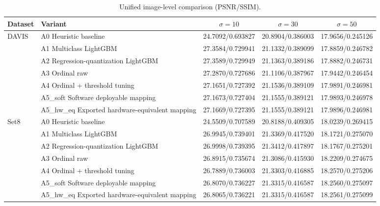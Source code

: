 \begin{table}[t]
\centering
\caption{Unified image-level comparison (PSNR/SSIM).}
\label{tab:unified_image}
\setlength{\tabcolsep}{4pt}
\begin{tabular}{llccc}
\toprule
Dataset & Variant & $\sigma=10$ & $\sigma=30$ & $\sigma=50$ \\
\midrule
\multirow{7}{*}{DAVIS} & A0 Heuristic baseline & 24.7092/0.693827 & 20.8904/0.386003 & 17.9656/0.245126 \\
 & A1 Multiclass LightGBM & 27.3584/0.729941 & 21.1332/0.389099 & 17.8859/0.246782 \\
 & A2 Regression-quantization LightGBM & 27.3589/0.729949 & 21.1363/0.389186 & 17.8882/0.246731 \\
 & A3 Ordinal raw & 27.2870/0.727686 & 21.1106/0.387967 & 17.9442/0.246454 \\
 & A4 Ordinal + threshold tuning & 27.1651/0.727392 & 21.1536/0.389109 & 17.9891/0.246981 \\
 & A5_soft Software deployable mapping & 27.1673/0.727404 & 21.1555/0.389121 & 17.9893/0.246978 \\
 & A5_hw_eq Exported hardware-equivalent mapping & 27.1669/0.727395 & 21.1555/0.389121 & 17.9896/0.246981 \\
\midrule
\multirow{7}{*}{Set8} & A0 Heuristic baseline & 24.5509/0.707589 & 20.8188/0.409305 & 18.0239/0.269415 \\
 & A1 Multiclass LightGBM & 26.9945/0.739401 & 21.3369/0.417520 & 18.1721/0.275070 \\
 & A2 Regression-quantization LightGBM & 26.9998/0.739395 & 21.3412/0.417897 & 18.1767/0.275201 \\
 & A3 Ordinal raw & 26.8915/0.735674 & 21.3086/0.415930 & 18.2209/0.274675 \\
 & A4 Ordinal + threshold tuning & 26.7889/0.736003 & 21.3303/0.416885 & 18.2570/0.275206 \\
 & A5_soft Software deployable mapping & 26.8070/0.736227 & 21.3315/0.416587 & 18.2560/0.275097 \\
 & A5_hw_eq Exported hardware-equivalent mapping & 26.8065/0.736221 & 21.3315/0.416587 & 18.2561/0.275099 \\
\bottomrule
\end{tabular}
\end{table}
